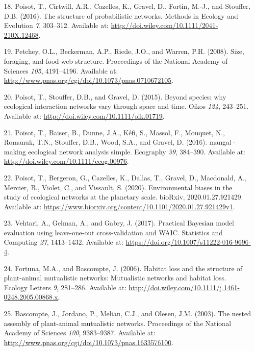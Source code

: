 \documentclass[12pt]{article}
\begin{document}
\begin{cslreferences}
\leavevmode\hypertarget{ref-PoisCirt16}{}%
18. Poisot, T., Cirtwill, A.R., Cazelles, K., Gravel, D., Fortin, M.-J.,
and Stouffer, D.B. (2016). The structure of probabilistic networks.
Methods in Ecology and Evolution \emph{7}, 303--312. Available at:
\url{http://doi.wiley.com/10.1111/2041-210X.12468}.

\leavevmode\hypertarget{ref-PetcBeck08}{}%
19. Petchey, O.L., Beckerman, A.P., Riede, J.O., and Warren, P.H.
(2008). Size, foraging, and food web structure. Proceedings of the
National Academy of Sciences \emph{105}, 4191--4196. Available at:
\url{http://www.pnas.org/cgi/doi/10.1073/pnas.0710672105}.

\leavevmode\hypertarget{ref-PoisStou15}{}%
20. Poisot, T., Stouffer, D.B., and Gravel, D. (2015). Beyond species:
why ecological interaction networks vary through space and time. Oikos
\emph{124}, 243--251. Available at:
\url{http://doi.wiley.com/10.1111/oik.01719}.

\leavevmode\hypertarget{ref-PoisBais16}{}%
21. Poisot, T., Baiser, B., Dunne, J.A., Kéfi, S., Massol, F., Mouquet,
N., Romanuk, T.N., Stouffer, D.B., Wood, S.A., and Gravel, D. (2016).
mangal - making ecological network analysis simple. Ecography \emph{39},
384--390. Available at: \url{http://doi.wiley.com/10.1111/ecog.00976}.

\leavevmode\hypertarget{ref-PoisBerg20}{}%
22. Poisot, T., Bergeron, G., Cazelles, K., Dallas, T., Gravel, D.,
Macdonald, A., Mercier, B., Violet, C., and Vissault, S. (2020).
Environmental biases in the study of ecological networks at the
planetary scale. bioRxiv, 2020.01.27.921429. Available at:
\url{https://www.biorxiv.org/content/10.1101/2020.01.27.921429v1}.

\leavevmode\hypertarget{ref-VehtGelm17}{}%
23. Vehtari, A., Gelman, A., and Gabry, J. (2017). Practical Bayesian
model evaluation using leave-one-out cross-validation and WAIC.
Statistics and Computing \emph{27}, 1413--1432. Available at:
\url{https://doi.org/10.1007/s11222-016-9696-4}.

\leavevmode\hypertarget{ref-FortBasc06a}{}%
24. Fortuna, M.A., and Bascompte, J. (2006). Habitat loss and the
structure of plant-animal mutualistic networks: Mutualistic networks and
habitat loss. Ecology Letters \emph{9}, 281--286. Available at:
\url{http://doi.wiley.com/10.1111/j.1461-0248.2005.00868.x}.

\leavevmode\hypertarget{ref-BascJord03}{}%
25. Bascompte, J., Jordano, P., Melian, C.J., and Olesen, J.M. (2003).
The nested assembly of plant-animal mutualistic networks. Proceedings of
the National Academy of Sciences \emph{100}, 9383--9387. Available at:
\url{http://www.pnas.org/cgi/doi/10.1073/pnas.1633576100}.


\end{cslreferences}
\end{document}
